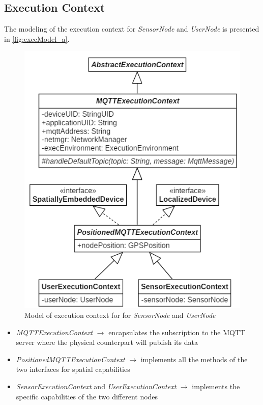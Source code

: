 \subsection{Execution Context}
The modeling of the execution context for \textit{SensorNode} and \textit{UserNode} is presented in \autoref{fig:execModel_a}.

\begin{figure}[h]
    \centering
    \includegraphics[scale=0.9]{images/execContextModel_v2a.png}
    \caption{Model of execution context for for \textit{SensorNode} and \textit{UserNode}}
    \label{fig:execModel_a}
\end{figure}

\begin{itemize}
    \item \textit{MQTTExecutionContext} $\rightarrow$ encapsulates the subscription to the MQTT server where the physical counterpart will publish its data
    \item \textit{PositionedMQTTExecutionContext} $\rightarrow$ implements all the methods of the two interfaces for spatial capabilities
    \item \textit{SensorExecutionContext} and \textit{UserExecutionContext} $\rightarrow$ implements the specific capabilities of the two different nodes
\end{itemize}

